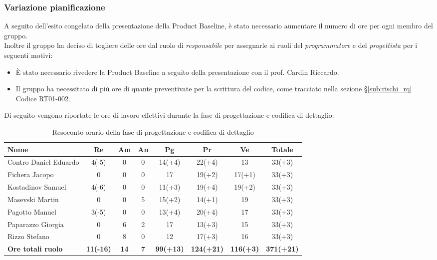 \documentclass[../piano_di_progetto.tex]{subfiles}
\begin{document}
\subsubsection{Variazione pianificazione}
A seguito dell'esito congelato della presentazione della Product Baseline, è stato necessario aumentare il numero di ore per ogni membro del gruppo.\\
Inoltre il gruppo ha deciso di togliere delle ore dal ruolo di \emph{responsabile} per assegnarle ai ruoli del \emph{programmatore} e del \emph{progettista} per i seguenti motivi:
\begin{itemize}
	\item È stato necessario rivedere la Product Baseline a seguito della presentazione con il prof. Cardin Riccardo.
	\item Il gruppo ha necessitato di più ore di quante preventivate per la scrittura del codice, come tracciato nella sezione \S\ref{sub:rischi_rq} Codice RT01-002. %
\end{itemize}

\noindent Di seguito vengono riportate le ore di lavoro effettivi durante la fase di progettazione e codifica di dettaglio: \\
\begin{table}[!ht]
	\centering
	\begin{tabular}{|l|c|c|c|c|c|c|c|}
	\hline
	\rowcolor{lightgray}
	\textbf{Nome} & \textbf{Re} & \textbf{Am} & \textbf{An} & \textbf{Pg}  & \textbf{Pr}   & \textbf{Ve} & \textbf{Totale}\\
	\hline
	Contro Daniel Eduardo & 4(-5) & 0 & 0 & 14(+4) & 22(+4) & 13 & 33(+3) \\
	Fichera Jacopo & 0 & 0 & 0 & 17 & 19(+2) & 17(+1) & 33(+3) \\
	Kostadinov Samuel & 4(-6) & 0 & 0 & 11(+3) & 19(+4) & 19(+2) & 33(+3) \\			
	Masevski Martin & 0 & 0 & 5 & 15(+2) & 14(+1) & 19 & 33(+3) \\
	Pagotto Manuel & 3(-5) & 0 & 0 & 13(+4) & 20(+4) & 17 & 33(+3) \\			
	Paparazzo Giorgia & 0 & 6 & 2 & 17 & 13(+3) & 15 & 33(+3) \\
	Rizzo Stefano & 0 & 8 & 0 & 12 & 17(+3) & 16 & 33(+3) \\
	\hline
	\textbf{Ore totali ruolo} & \textbf{11(-16)} & \textbf{14} & \textbf{7} & \textbf{99(+13)} & \textbf{124(+21)} & \textbf{116(+3)} & \textbf{371(+21)} \\
	\hline
	\end{tabular}
	\caption{Resoconto orario della fase di progettazione e codifica di dettaglio}
\end{table}
\end{document}
